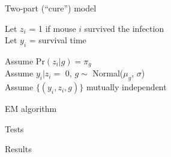 \documentclass[aspectratio=169,12pt,t]{beamer}
\begin{document}
\begin{frame}{Two-part (``cure'') model}

  \bbi
  \itemsep24pt

  \item Let $z_i$ = 1 if mouse $i$ survived the infection \\[12pt]

  {\color{background} Let} $y_i$ = survival time

\item Assume $\text{Pr}(z_i|g) = \pi_g$ \\[12pt]

  {\color{background} Assume} $y_i | z_i=$ 0, $g \sim$ Normal($\mu_g$,
  $\sigma$) \\[12pt]

  {\color{background} Assume} $\{(y_i, z_i, g)\}$ mutually independent

  \ei

\end{frame}



\begin{frame}{EM algorithm}

\end{frame}



\begin{frame}{Tests}
\end{frame}


\begin{frame}[c]{Results}

\end{frame}
\end{document}
